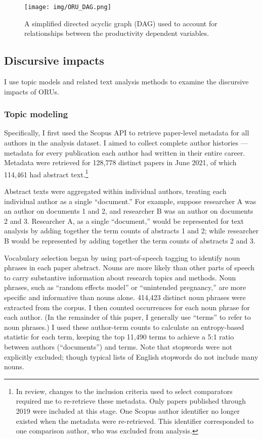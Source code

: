 \documentclass[
  11pt,
]{article}
\begin{document}
\begin{figure}
\centering
\texttt{[image: img/ORU\_DAG.png]}
\caption{A simplified directed acyclic graph (DAG) used to account for relationships between the productivity dependent variables. \label{fig.dag}}
\end{figure}

\hypertarget{discursive-impacts-1}{%
\subsection{Discursive impacts}\label{discursive-impacts-1}}

I use topic models and related text analysis methods to examine the discursive impacts of ORUs.

\hypertarget{topic-modeling}{%
\subsubsection{Topic modeling}\label{topic-modeling}}

Specifically, I first used the Scopus API to retrieve paper-level metadata for all authors in the analysis dataset. I aimed to collect complete author histories --- metadata for every publication each author had written in their entire career. Metadata were retrieved for 128,778 distinct papers in June 2021, of which 114,461 had abstract text.\footnote{In review, changes to the inclusion criteria used to select comparators required me to re-retrieve these metadata. Only papers published through 2019 were included at this stage. One Scopus author identifier no longer existed when the metadata were re-retrieved. This identifier corresponded to one comparison author, who was excluded from analysis.}

Abstract texts were aggregated within individual authors, treating each individual author as a single ``document.'' For example, suppose researcher A was an author on documents 1 and 2, and researcher B was an author on documents 2 and 3. Researcher A, as a single ``document,'' would be represented for text analysis by adding together the term counts of abstracts 1 and 2; while researcher B would be represented by adding together the term counts of abstracts 2 and 3.

Vocabulary selection began by using part-of-speech tagging to identify noun phrases in each paper abstract. Nouns are more likely than other parts of speech to carry substantive information about research topics and methods. Noun phrases, such as ``random effects model'' or ``unintended pregnancy,'' are more specific and informative than nouns alone. 414,423 distinct noun phrases were extracted from the corpus. I then counted occurrences for each noun phrase for each author. (In the remainder of this paper, I generally use ``terms'' to refer to noun phrases.) I used these author-term counts to calculate an entropy-based statistic for each term, keeping the top 11,490 terms to achieve a 5:1 ratio between authors (``documents'') and terms. Note that stopwords were not explicitly excluded; though typical lists of English stopwords do not include many nouns.
\end{document}
